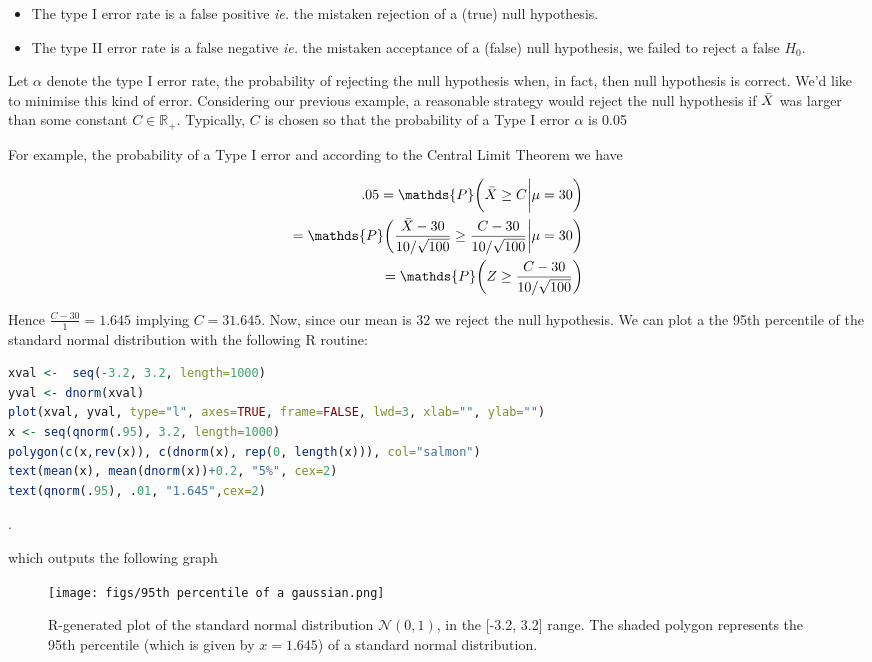 \documentclass{homework}
\begin{document}
\begin{itemize}
    \item The type I error rate is a false positive \textit{ie.} the mistaken rejection of a (true) null hypothesis. 
    \item The type II error rate is a false negative \textit{ie.} the mistaken acceptance of a (false) null hypothesis, we failed to reject a false $H_0$.
\end{itemize}

Let $\alpha$ denote the type I error rate, the probability of rejecting the null hypothesis when, in fact, then null hypothesis is correct. We'd like to minimise this kind of error. Considering our previous example, a reasonable strategy would reject the null hypothesis if $\Bar{X}$ was larger than some constant $C \in \mathds{R}_{+}$. Typically, $C$ is chosen so that the probability of a Type I error $\alpha$ is 0.05

For example, the probability of a Type I error and according to the Central Limit Theorem we have  

\begin{align}
        .05 = \mathds{P}\bigg(\Bar{X}\geq C \bigg| \mu = 30 \bigg) \\
        = \mathds{P}\bigg(\frac{\Bar{X}-30}{10/\sqrt{100}}\geq \frac{C-30}{10/\sqrt{100}} \bigg| \mu = 30 \bigg) \\
        =  \mathds{P}\bigg(Z\geq \frac{C-30}{10/\sqrt{100}}\bigg)
\end{align}

Hence $\frac{C-30}{1}=1.645$ implying $C=31.645$. Now, since our mean is $32$ we reject the null hypothesis. We can plot a the 95th percentile of the standard normal distribution with the following R routine:
\begin{lstlisting}[language=R]
xval <-  seq(-3.2, 3.2, length=1000)
yval <- dnorm(xval)
plot(xval, yval, type="l", axes=TRUE, frame=FALSE, lwd=3, xlab="", ylab="")
x <- seq(qnorm(.95), 3.2, length=1000)
polygon(c(x,rev(x)), c(dnorm(x), rep(0, length(x))), col="salmon")
text(mean(x), mean(dnorm(x))+0.2, "5%", cex=2)
text(qnorm(.95), .01, "1.645",cex=2)
\end{lstlisting}. 

which outputs the following graph

\begin{figure}
    \centering
    \texttt{[image: figs/95th percentile of a gaussian.png]} 
    \caption{R-generated plot of the standard normal distribution $\mathcal{N}(0,1)$,  in the [-3.2, 3.2] range. The shaded polygon represents the 95th percentile (which is given by $x=1.645$) of a standard normal distribution. }
    \label{fig:my_label}
\end{figure}
\end{document}
